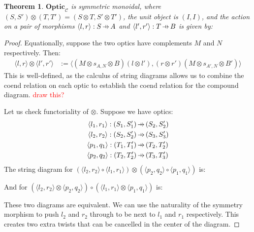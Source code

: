 \documentclass[11pt,a4paper]{article}
\theoremstyle{plain}
\newtheorem{theorem}{Theorem}[subsection]
\theoremstyle{definition}
\newcommand{\C}{\mathscr{C}}
\newcommand{\Optic}{\mathbf{Optic}}
\newcommand{\hto}{\ensuremath{\,\mathaccent\shortmid\rightarrow\,}}
\newcommand{\todo}[1]{\textcolor{red}{\small #1}}
\begin{document}
\begin{theorem}
  $\Optic_\C$ is symmetric monoidal, where $(S, S') \otimes (T, T') = (S \otimes T, S' \otimes T')$, the unit object is $(I, I)$, and the action on a pair of morphisms $\langle l, r \rangle : S \hto A$ and $\langle l', r' \rangle : T \hto B$ is given by:
  \begin{center}
    
  \end{center}
\end{theorem}
\begin{proof}
  Equationally, suppose the two optics have complements $M$ and $N$ respectively. Then:
  \begin{align*}
    \langle l, r \rangle \otimes \langle l', r' \rangle &:= \langle (M \otimes s_{A,N} \otimes B)(l \otimes l'), (r \otimes r')(M \otimes s_{A',N} \otimes B') \rangle
  \end{align*}
  This is well-defined, as the calculus of string diagrams allows us to combine the coend relation on each optic to establish the coend relation for the compound diagram. \todo{draw this?}

  Let us check functoriality of $\otimes$. Suppose we have optics:
  \begin{align*}
    \langle l_1, r_1 \rangle : (S_1, S_1') &\hto (S_2, S_2') \\
    \langle l_2, r_2 \rangle : (S_2, S_2') &\hto (S_3, S_3') \\
    \langle p_1, q_1 \rangle : (T_1, T_1') &\hto (T_2, T_2') \\
    \langle p_2, q_2 \rangle : (T_2, T_2') &\hto (T_3, T_3')
  \end{align*}
  The string diagram for $(\langle l_2, r_2 \rangle \circ \langle l_1, r_1 \rangle) \otimes (\langle p_2, q_2 \rangle \circ \langle p_1, q_1 \rangle)$ is:
  \begin{center}
    
  \end{center}
  And for $(\langle l_2, r_2 \rangle \otimes \langle p_2, q_2 \rangle) \circ (\langle l_1, r_1 \rangle \otimes \langle p_1, q_1 \rangle)$ is:
  \begin{center}
    
  \end{center}
  These two diagrams are equivalent. We can use the naturality of the symmetry morphism to push $l_2$ and $r_2$ through to be next to $l_1$ and $r_1$ respectively. This creates two extra twists that can be cancelled in the center of the diagram.


\end{proof}
\end{document}
